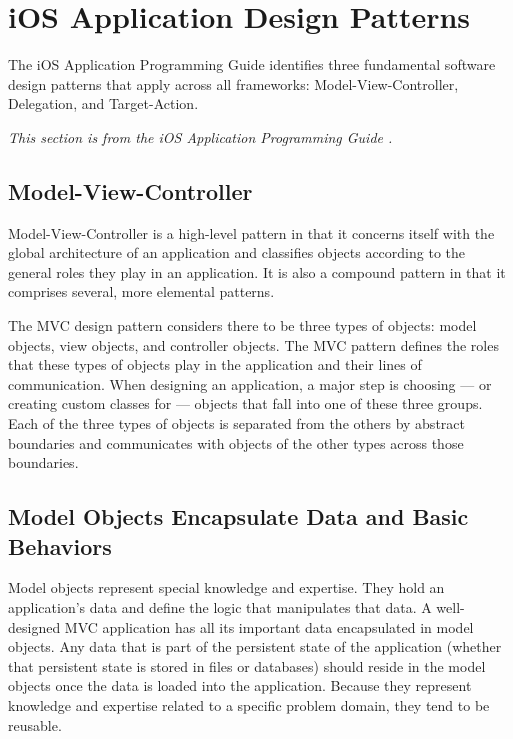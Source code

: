 \section{iOS Application Design Patterns}
\label{sect:cocoa}

The iOS Application Programming Guide identifies three fundamental software
design patterns that apply across all frameworks: Model-View-Controller,
Delegation, and Target-Action.

\emph{This section is from the iOS Application Programming Guide
\cite[p.~160--165]{ios:cocoa-fundamentals}.}

\subsection{Model-View-Controller}
\label{sect:cocoa_mvc}

Model-View-Controller is a high-level pattern in that it concerns itself
with the global architecture of an application and classifies objects
according to the general roles they play in an application. It is also a
compound pattern in that it comprises several, more elemental patterns.

The MVC design pattern considers there to be three types of objects: model
objects, view objects, and controller objects. The MVC pattern defines the
roles that these types of objects play in the application and their lines of
communication. When designing an application, a major step is choosing ---
or creating custom classes for --- objects that fall into one of these three
groups. Each of the three types of objects is separated from the others by
abstract boundaries and communicates with objects of the other types across
those boundaries.

\subsection{Model Objects Encapsulate Data and Basic Behaviors}

Model objects represent special knowledge and expertise. They hold an
application's data and define the logic that manipulates that data. A
well-designed MVC application has all its important data encapsulated in model
objects. Any data that is part of the persistent state of the application
(whether that persistent state is stored in files or databases) should reside in
the model objects once the data is loaded into the application. Because they
represent knowledge and expertise related to a specific problem domain, they
tend to be reusable.

